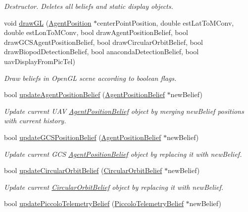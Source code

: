 \begin{DoxyCompactItemize}
\begin{DoxyCompactList}\small\item\em Destructor. Deletes all beliefs and static display objects. \end{DoxyCompactList}\item 
void \hyperlink{class_belief_collection_ae4bab3f004643dcc070ff406aef46440}{drawGL} (\hyperlink{class_agent_position}{AgentPosition} $\ast$centerPointPosition, double estLatToMConv, double estLonToMConv, bool drawAgentPositionBelief, bool drawGCSAgentPositionBelief, bool drawCircularOrbitBelief, bool drawBiopodDetectionBelief, bool anacondaDetectionBelief, bool uavDisplayFromPicTel)
\begin{DoxyCompactList}\small\item\em Draw beliefs in OpenGL scene according to boolean flags. \end{DoxyCompactList}\item 
bool \hyperlink{class_belief_collection_a13bccfcb55503a3b8b666010646cf164}{updateAgentPositionBelief} (\hyperlink{class_agent_position_belief}{AgentPositionBelief} $\ast$newBelief)
\begin{DoxyCompactList}\small\item\em Update current UAV \hyperlink{class_agent_position_belief}{AgentPositionBelief} object by merging newBelief positions with current history. \end{DoxyCompactList}\item 
bool \hyperlink{class_belief_collection_aa940d5ed600beb03870764ed21ad1769}{updateGCSPositionBelief} (\hyperlink{class_agent_position_belief}{AgentPositionBelief} $\ast$newBelief)
\begin{DoxyCompactList}\small\item\em Update current GCS \hyperlink{class_agent_position_belief}{AgentPositionBelief} object by replacing it with newBelief. \end{DoxyCompactList}\item 
bool \hyperlink{class_belief_collection_a610eedcd4f6bf5d2a1a81067525fb82f}{updateCircularOrbitBelief} (\hyperlink{class_circular_orbit_belief}{CircularOrbitBelief} $\ast$newBelief)
\begin{DoxyCompactList}\small\item\em Update current \hyperlink{class_circular_orbit_belief}{CircularOrbitBelief} object by replacing it with newBelief. \end{DoxyCompactList}\item 
bool \hyperlink{class_belief_collection_a4bd13ec5fd72f788daece4596e1330eb}{updatePiccoloTelemetryBelief} (\hyperlink{class_piccolo_telemetry_belief}{PiccoloTelemetryBelief} $\ast$newBelief)

\end{DoxyCompactItemize}
